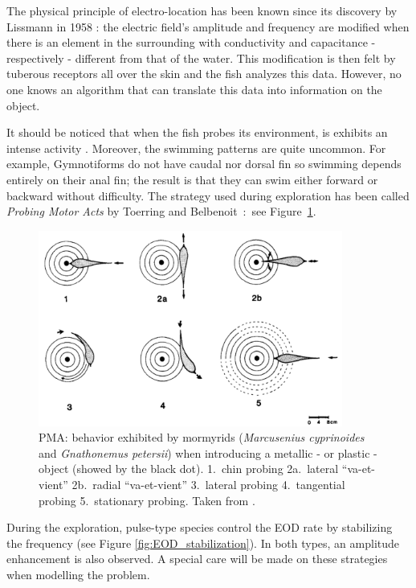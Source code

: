 The physical principle of electro-location has been known since its
discovery by Lissmann in 1958 \cite{lissmann1958mechanism}:
the electric field's amplitude and frequency are modified when there
is an element in the surrounding with conductivity and capacitance
- respectively - different from that of the water. This modification
is then felt by tuberous receptors all over the skin and the fish
analyzes this data. However, no one knows an algorithm that can translate
this data into information on the object.

It should be noticed that when the fish probes its environment, is
exhibits an intense activity \cite{lannoo1993electric}. Moreover,
the swimming patterns are quite uncommon. For example, Gymnotiforms
do not have caudal nor dorsal fin so swimming depends entirely on
their anal fin; the result is that they can swim either forward or
backward without difficulty. The strategy used during exploration
has been called \emph{Probing Motor Acts} by Toerring and Belbenoit~\cite{toerring1979motor}:~see
Figure~\ref{fig:pma}. 
\begin{figure}[h]
 \centering
\includegraphics[width=10cm]{intro/figures/PMA}
 \caption{PMA: behavior exhibited by mormyrids (\emph{Marcusenius cyprinoides
}and \emph{Gnathonemus petersii}) when introducing a metallic - or
plastic - object (showed by the black dot). 1.~chin probing 2a.~lateral
``va-et-vient'' 2b.~radial ``va-et-vient'' 3.~lateral probing
4.~tangential probing 5.~stationary probing. Taken from \cite{toerring1984locomotor}.\label{fig:pma}}
\end{figure}


During the exploration, pulse-type species control the EOD rate by
stabilizing the frequency (see Figure \ref{fig:EOD_stabilization}).
In both types, an amplitude enhancement is also observed. A special
care will be made on these strategies when modelling the problem.

